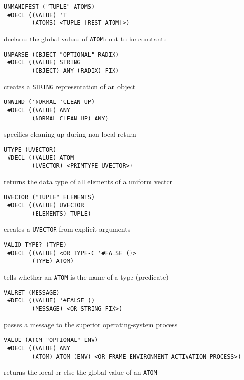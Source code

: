 \documentclass[a4paper,]{article}
\begin{document}
\begin{verbatim}
UNMANIFEST ("TUPLE" ATOMS)
 #DECL ((VALUE) 'T
        (ATOMS) <TUPLE [REST ATOM]>)
\end{verbatim}

declares the global values of \texttt{ATOM}s not to be constants

\begin{verbatim}
UNPARSE (OBJECT "OPTIONAL" RADIX)
 #DECL ((VALUE) STRING
        (OBJECT) ANY (RADIX) FIX)
\end{verbatim}

creates a \texttt{STRING} representation of an object

\begin{verbatim}
UNWIND ('NORMAL 'CLEAN-UP)
 #DECL ((VALUE) ANY
        (NORMAL CLEAN-UP) ANY)
\end{verbatim}

specifies cleaning-up during non-local return

\begin{verbatim}
UTYPE (UVECTOR)
 #DECL ((VALUE) ATOM
        (UVECTOR) <PRIMTYPE UVECTOR>)
\end{verbatim}

returns the data type of all elements of a uniform vector

\begin{verbatim}
UVECTOR ("TUPLE" ELEMENTS)
 #DECL ((VALUE) UVECTOR
        (ELEMENTS) TUPLE)
\end{verbatim}

creates a \texttt{UVECTOR} from explicit arguments

\begin{verbatim}
VALID-TYPE? (TYPE)
 #DECL ((VALUE) <OR TYPE-C '#FALSE ()>
        (TYPE) ATOM)
\end{verbatim}

tells whether an \texttt{ATOM} is the name of a type (predicate)

\begin{verbatim}
VALRET (MESSAGE)
 #DECL ((VALUE) '#FALSE ()
        (MESSAGE) <OR STRING FIX>)
\end{verbatim}

passes a message to the superior operating-system process

\begin{verbatim}
VALUE (ATOM "OPTIONAL" ENV)
 #DECL ((VALUE) ANY
        (ATOM) ATOM (ENV) <OR FRAME ENVIRONMENT ACTIVATION PROCESS>)
\end{verbatim}

returns the local or else the global value of an \texttt{ATOM}
\end{document}
